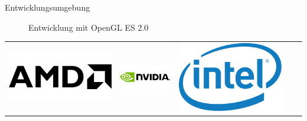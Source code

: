 \begin{frame}{Entwicklungsumgebung}
{\begin{figure}
		\caption{Entwicklung mit OpenGL ES 2.0}
	\end{figure}
}
\begin{table}[h]
	\begin{tabular}{c|c|c|c|c}
		\includegraphics[width=\textwidth, height=0.1\textheight, keepaspectratio]{images/AMD_Logo} &
		\includegraphics[width=\textwidth, height=0.1\textheight, keepaspectratio]{images/nvidia-logo} &
		\includegraphics[width=\textwidth, height=0.1\textheight, keepaspectratio]{images/Intel-logo}  &

\end{tabular}
\end{table}
\end{frame}
